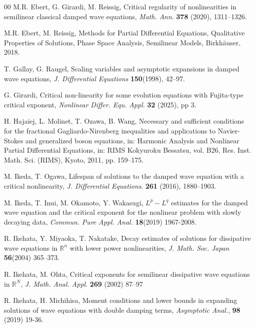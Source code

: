 \documentclass[11pt,reqno]{amsart}
\begin{document}
\begin{thebibliography}{00}
 M.R. Ebert, G. Girardi,  M. Reissig, Critical regularity of nonlinearities in semilinear classical damped wave equations, {\it{Math. Ann.}} {\bf378} (2020), 1311–1326.

 M.R. Ebert, M. Reissig, Methods for Partial Differential Equations, Qualitative Properties of Solutions, Phase Space
Analysis, Semilinear Models, Birkhäuser, 2018.

 T. Gallay, G. Raugel, Scaling variables and asymptotic expansions in damped
wave equations, \textit{J. Differential Equations } \textbf{150}(1998), 42–97.

 G. Girardi,  Critical non-linearity for some evolution equations with Fujita-type critical exponent, \textit{Nonlinear Differ. Equ. Appl. } \textbf{32} (2025), pp 3.

 H. Hajaiej, L. Molinet, T. Ozawa, B. Wang, Necessary and sufficient conditions for the fractional Gagliardo-Nirenberg
inequalities and applications to Navier-Stokes and generalized boson equations, in: Harmonic Analysis and Nonlinear
Partial Differential Equations, in: RIMS Kokyuroku Bessatsu, vol. B26, Res. Inst. Math. Sci. (RIMS), Kyoto, 2011,
pp. 159–175.

 M. Ikeda, T. Ogawa, Lifespan of solutions to the damped wave equation with a critical nonlinearity, \textit{J. Differential Equations}. \textbf{261} (2016), 1880--1903.

 M. Ikeda, T. Inui, M. Okamoto, Y. Wakasugi, $L^p - L^q$ estimates for the damped wave equation and the critical exponent for the nonlinear problem with slowly decaying data, \textit{Commun. Pure Appl. Anal.} \textbf{18}(2019) 1967-2008.

 R. Ikehata, Y. Miyaoka, T. Nakatake, Decay estimates of solutions for dissipative wave equations in $\mathbb{R}^n$ with lower power nonlinearities, \textit{J. Math. Soc. Japan} \textbf{56}(2004) 365–373. 


 R. Ikehata, M. Ohta, Critical exponents for semilinear dissipative wave equations in $\mathbb{R}^N$, \textit{J. Math. Anal. Appl.} \textbf{269} (2002)  87–97

 R. Ikehata, H. Michihisa, Moment conditions and lower bounds in expanding solutions of wave equations with double damping terms, \textit{Asymptotic Anal.}, \textbf{98} (2019) 19-36.


\end{thebibliography}
\end{document}
